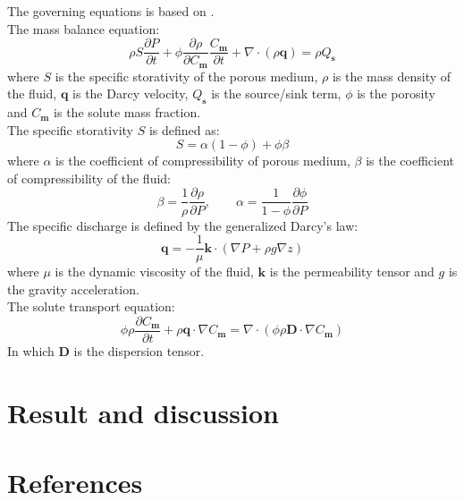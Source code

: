 \documentclass[review]{elsarticle}
\newcommand{\mbf}[1]{{\mathbf{#1}}}%
\begin{document}
The governing equations is based on \cite{ackerer1999modeling}. \\
The mass balance equation: 
\begin{equation}\label{eq:mass_conserv}
\rho S\frac{\partial P}{\partial t} + \phi \frac{\partial \rho}{\partial C_\mbf{m}}\frac{C_\mbf{m}}{\partial t} + \nabla\cdot(\rho\mbf{q}) = \rho Q_\mbf{s}
\end{equation}
where $S$ is the specific storativity of the porous medium, $\rho$ is the mass density of the fluid, $\mbf{q}$ is the Darcy velocity, $Q_\mbf{s}$ is the source/sink term, $\phi$ is the porosity and $C_\mbf{m}$ is the solute mass fraction. \\
The specific storativity $S$ is defined as:
\begin{equation}\label{eq:specific_S}
S = \alpha (1 - \phi) + \phi \beta
\end{equation} 
where $\alpha$ is the coefficient of compressibility of porous medium, $\beta$ is the coefficient of compressibility of the fluid:
\begin{equation}\label{eq:beta_alpha}
\beta = \frac{1}{\rho}\frac{\partial \rho}{\partial P}, \qquad \alpha = \frac{1}{1 - \phi}\frac{\partial \phi}{\partial P}
\end{equation}
The specific discharge is defined by the generalized Darcy's law:
\begin{equation}\label{eq:darcy_velocity}
\mbf{q} = - \frac{1}{\mu}\mbf{k}\cdot(\nabla P + \rho g \nabla z)
\end{equation}
where $\mu$ is the dynamic viscosity of the fluid, $\mbf{k}$ is the permeability tensor and $g$ is the gravity acceleration. \\
The solute transport equation:
\begin{equation}
\phi \rho \frac{\partial C_\mbf{m}}{\partial t} + \rho \mbf{q}\cdot\nabla C_\mbf{m} = \nabla\cdot(\phi \rho \mbf{D}\cdot\nabla C_\mbf{m})
\end{equation}
In which $\mbf{D}$ is the dispersion tensor. 









 

\section{Result and discussion}


\section*{References}


\end{document}
